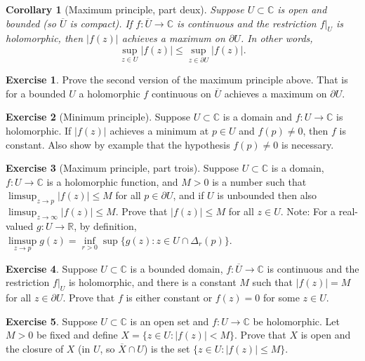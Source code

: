 \documentclass[12pt,openany]{book}
\newcommand{\sabs}[1]{\lvert {#1} \rvert}
\newcommand{\C}{{\mathbb{C}}}
\newcommand{\R}{{\mathbb{R}}}
\theoremstyle{plain}
\newtheorem{cor}[thm]{Corollary}
\theoremstyle{remark}
\theoremstyle{definition}
\newenvironment{exbox}{%
    \def\FrameCommand{\vrule width 1pt \relax\hspace {10pt}}%
    \MakeFramed {\advance \hsize -\width \FrameRestore }%
}{%
    \endMakeFramed
}
\theoremstyle{exercise}
\newtheorem{exercise}{Exercise}[section]
\theoremstyle{example}
\begin{document}
\begin{cor}[Maximum principle, part deux]
%
Suppose $U \subset \C$ is open and bounded (so $\overline{U}$ is compact).
If $f \colon \overline{U} \to \C$ is continuous and the restriction $f|_{U}$
is holomorphic, then $\sabs{f(z)}$ achieves a maximum on $\partial U$.  In
other words,
\begin{equation*}
\sup_{z \in U} \sabs{f(z)} \leq
\sup_{z \in \partial U} \sabs{f(z)} .
\end{equation*}
\end{cor}

\begin{exbox}
\begin{exercise}
Prove the second version of the maximum principle above.
That is for a bounded $U$ a holomorphic $f$ continuous
on $\overline{U}$ achieves a maximum on $\partial U$.
\end{exercise}

\begin{exercise}[Minimum principle]
Suppose $U \subset \C$ is a domain and
$f \colon U \to \C$ is holomorphic.
If $\sabs{f(z)}$ achieves a minimum at $p \in U$ and $f(p) \not= 0$,
then $f$ is constant.  Also show by example that the hypothesis
$f(p) \not= 0$ is necessary.
\end{exercise}

\begin{exercise}[Maximum principle, part trois]
Suppose $U \subset \C$ is a domain, $f \colon U \to \C$ is a holomorphic
function, and $M > 0$ is a number such that
$\limsup_{z \to p} \sabs{f(z)} \leq M$ for all $p \in \partial U$,
and if $U$ is unbounded then also 
$\limsup_{z \to \infty} \sabs{f(z)} \leq M$.  Prove that
$\sabs{f(z)} \leq M$ for all $z \in U$.
Note: For a real-valued $g \colon U \to \R$,
by definition,
$\limsup\limits_{z\to p} g(z) = \inf\limits_{r > 0} \sup \bigl\{ g(z) : z \in U
\cap \Delta_r(p) \bigr\}$.
\end{exercise}

\begin{exercise}
Suppose $U \subset \C$ is a bounded domain,
$f \colon \overline{U} \to \C$ is continuous and the restriction $f|_{U}$
is holomorphic, and there is a constant $M$ such that $\sabs{f(z)} = M$
for all $z \in \partial U$.  Prove that $f$ is either constant or $f(z) = 0$
for some $z \in U$.
\end{exercise}

\begin{exercise}
Suppose $U \subset \C$ is an open set and $f \colon U \to \C$ be holomorphic.
Let $M > 0$ be fixed and
define $X = \bigl\{ z \in U : \sabs{f(z)} < M \bigr\}$.
Prove that $X$ is open and the closure of $X$ (in $U$, so $\overline{X} \cap U$) is the set
$\bigl\{ z \in U : \sabs{f(z)} \leq M \bigr\}$.
\end{exercise}


\end{exbox}
\end{document}
